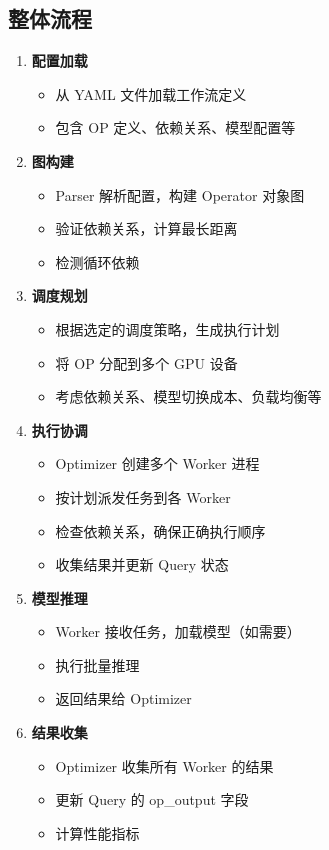 \documentclass[12pt,a4paper]{article}
\begin{document}
\subsection{整体流程}

\begin{enumerate}
    \item \textbf{配置加载}
    \begin{itemize}
        \item 从 YAML 文件加载工作流定义
        \item 包含 OP 定义、依赖关系、模型配置等
    \end{itemize}
    
    \item \textbf{图构建}
    \begin{itemize}
        \item Parser 解析配置，构建 Operator 对象图
        \item 验证依赖关系，计算最长距离
        \item 检测循环依赖
    \end{itemize}
    
    \item \textbf{调度规划}
    \begin{itemize}
        \item 根据选定的调度策略，生成执行计划
        \item 将 OP 分配到多个 GPU 设备
        \item 考虑依赖关系、模型切换成本、负载均衡等
    \end{itemize}
    
    \item \textbf{执行协调}
    \begin{itemize}
        \item Optimizer 创建多个 Worker 进程
        \item 按计划派发任务到各 Worker
        \item 检查依赖关系，确保正确执行顺序
        \item 收集结果并更新 Query 状态
    \end{itemize}
    
    \item \textbf{模型推理}
    \begin{itemize}
        \item Worker 接收任务，加载模型（如需要）
        \item 执行批量推理
        \item 返回结果给 Optimizer
    \end{itemize}
    
    \item \textbf{结果收集}
    \begin{itemize}
        \item Optimizer 收集所有 Worker 的结果
        \item 更新 Query 的 op\_output 字段
        \item 计算性能指标
    \end{itemize}
\end{enumerate}
\end{document}
